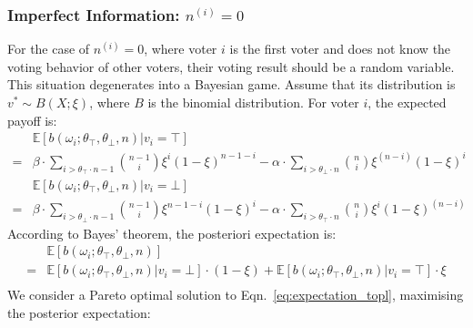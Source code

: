 \documentclass[11pt]{article}
\begin{document}
  \subsubsection{Imperfect Information: $n^{(i)}=0$}
  \label{sec:imperfect_information}
  For the case of $n^{(i)}=0$, where voter $i$ is the first voter and does not know the voting behavior of other voters, their voting result should be a random variable. This situation degenerates into a Bayesian game.
  Assume that its distribution is $v^*\sim B(X;\xi)$, where $B$ is the binomial distribution. For voter $i$, the expected payoff is:
  \begin{equation}
    \label{eq:expectation_top}
    \begin{aligned}
      &\mathbb{E}[b(\omega_i;\theta_\top,\theta_\bot,n )| v_i=\top]\\ 
      = &\beta\cdot\sum_{i>\theta_\top\cdot n-1}{\binom{n-1}{i}\xi^i(1-\xi)^{n-1-i}} - \alpha\cdot\sum_{i>\theta_\bot\cdot n}{\binom{n}{i}\xi^{(n-i)}(1-\xi)^{i}}
    \end{aligned}
  \end{equation}
  \begin{equation}
    \label{eq:expectation_bot}
    \begin{aligned}
      &\mathbb{E}[b(\omega_i;\theta_\top,\theta_\bot,n )| v_i=\bot]\\
       =& \beta\cdot\sum_{i>\theta_\bot\cdot n-1}{\binom{n-1}{i}\xi^{n-1-i}(1-\xi)^i}- \alpha\cdot\sum_{i>\theta_\top\cdot n}{\binom{n}{i}\xi^{i}(1-\xi)^{(n-i)}}
    \end{aligned}
  \end{equation}
  According to Bayes' theorem, the posteriori expectation is:
  \begin{equation}
    \label{eq:expectation_topl}
    \begin{aligned}
      &\mathbb{E}[b(\omega_i;\theta_\top,\theta_\bot,n)] \\
      = &\mathbb{E}[b(\omega_i;\theta_\top,\theta_\bot,n )| v_i=\bot]\cdot (1-\xi)+ \mathbb{E}[b(\omega_i;\theta_\top,\theta_\bot,n )| v_i=\top]\cdot \xi\\
    \end{aligned}
  \end{equation}
  We consider a Pareto optimal solution to Eqn.~\ref{eq:expectation_topl}, maximising the posterior expectation:
\end{document}
